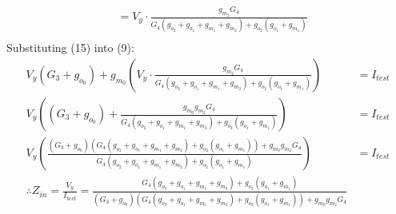\begin{enumerate}
\begin{align*}
              &= V_{y} \cdot \frac{g_{m_2}G_4}{G_4(g_{o_2} + g_{o_1} + g_{m_1} + g_{m_2}) + g_{o_2}(g_{o_1} + g_{m_1})} \tag{15} \\
      \end{align*}
      Substituting (15) into (9):
      \begin{align*}
        V_{y}(G_3 + g_{o_0}) + g_{m_0}\left(V_{y} \cdot \frac{g_{m_2}G_4}{G_4(g_{o_2} + g_{o_1} + g_{m_1} + g_{m_2}) + g_{o_2}(g_{o_1} + g_{m_1})}\right) &= I_{test} \\
        V_{y}\left((G_3 + g_{o_0}) + \frac{g_{m_0}g_{m_2}G_4}{G_4(g_{o_2} + g_{o_1} + g_{m_1} + g_{m_2}) + g_{o_2}(g_{o_1} + g_{m_1})}\right) &= I_{test} \\
        V_{y}\left(\frac{(G_3 + g_{o_0})(G_4(g_{o_2} + g_{o_1} + g_{m_1} + g_{m_2}) + g_{o_2}(g_{o_1} + g_{m_1})) + g_{m_0}g_{m_2}G_4}{G_4(g_{o_2} + g_{o_1} + g_{m_1} + g_{m_2}) + g_{o_2}(g_{o_1} + g_{m_1})}\right) &= I_{test} \\
        \therefore Z_{in} = \frac{V_{y}}{I_{test}} = \frac{G_4(g_{o_2} + g_{o_1} + g_{m_1} + g_{m_2}) + g_{o_2}(g_{o_1} + g_{m_1})}{(G_3 + g_{o_0})(G_4(g_{o_2} + g_{o_1} + g_{m_1} + g_{m_2}) + g_{o_2}(g_{o_1} + g_{m_1})) + g_{m_0}g_{m_2}G_4} \\
      \end{align*}

\end{enumerate}
